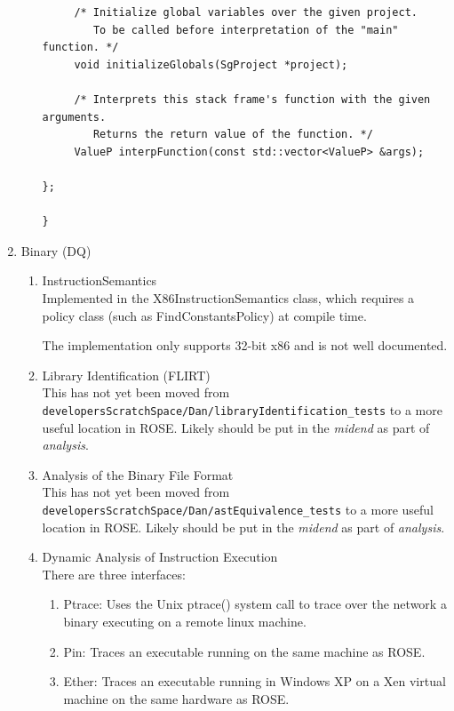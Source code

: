\begin{enumerate}
\begin{enumerate}
\begin{lstlisting}
     /* Initialize global variables over the given project.
        To be called before interpretation of the "main" function. */
     void initializeGlobals(SgProject *project);

     /* Interprets this stack frame's function with the given arguments.
        Returns the return value of the function. */
     ValueP interpFunction(const std::vector<ValueP> &args);

};

}
\end{lstlisting}
   \end{enumerate}

   \item Binary (DQ) \\
   \begin{enumerate}
      \item InstructionSemantics \\
	Implemented in the X86InstructionSemantics class, which
	requires a policy class (such as FindConstantsPolicy) at
	compile time.

	The implementation only supports 32-bit x86 and is not well
	documented.
      
      \item Library Identification (FLIRT) \\
      This has not yet been moved from {\tt developersScratchSpace/Dan/libraryIdentification\_tests}
      to a more useful location in ROSE.  Likely should be put in the {\em midend} as part
      of {\em analysis}.

      \item Analysis of the Binary File Format \\
      This has not yet been moved from {\tt developersScratchSpace/Dan/astEquivalence\_tests}
      to a more useful location in ROSE.  Likely should be put in the {\em midend} as part
      of {\em analysis}.

      \item Dynamic Analysis of Instruction Execution \\
      There are three interfaces:
      \begin{enumerate}
         \item Ptrace: Uses the Unix ptrace() system call to trace over 
               the network a binary executing on a remote linux machine.
         \item Pin: Traces an executable running on the same machine as ROSE.
         \item Ether: Traces an executable running in Windows XP on 
               a Xen virtual machine on the same hardware as ROSE.
      \end{enumerate}


\end{enumerate}
\end{enumerate}
